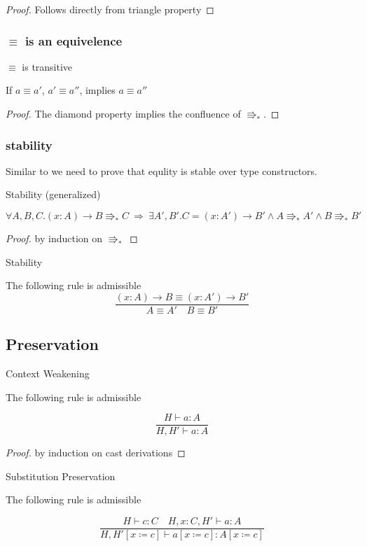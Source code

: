 \begin{proof}
Follows directly from triangle property
\end{proof}

\subsubsection{$\equiv$ is an equivelence}

\begin{thm}
$\equiv$ is transitive

If $a\equiv a'$, $a'\equiv a''$, implies $a\equiv a''$ 
\end{thm}

\begin{proof}
The diamond property implies the confluence of $\Rrightarrow_{\ast}$.
\end{proof}

\subsubsection{stability}
Similar to  we need to prove that equlity is stable over type constructors.
\begin{lem}
Stability (generalized)

$\forall A,B,C.\left(x:A\right)\rightarrow B\Rrightarrow_{\ast}C\:\Rightarrow\:\exists A',B'.C=\left(x:A'\right)\rightarrow B'\land A\Rrightarrow_{\ast}A'\land B\Rrightarrow_{\ast}B'$
\end{lem}

\begin{proof}
by induction on $\Rrightarrow_{\ast}$
\end{proof}
\begin{cor}
Stability

The following rule is admissible
\[
\frac{\left(x:A\right)\rightarrow B\equiv\left(x:A'\right)\rightarrow B'}{A\equiv A'\quad B\equiv B'}
\]
\end{cor}


\subsection{Preservation}
\begin{lem}
Context Weakening

The following rule is admissible

\[
\frac{H\vdash a:A}{H,H'\vdash a:A}
\]
\end{lem}

\begin{proof}
by induction on cast derivations
\end{proof}
\begin{lem}
Substitution Preservation

The following rule is admissible

\[
\frac{H\vdash c:C\quad H,x:C,H'\vdash a:A}{H,H'\left[x\coloneqq c\right]\vdash a\left[x\coloneqq c\right]:A\left[x\coloneqq c\right]}
\]
\end{lem}

